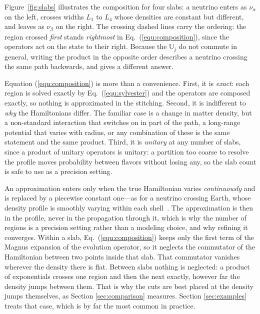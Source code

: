 \documentclass[final,5p,times,twocolumn,sort,compress]{elsarticle}
\newcommand{\eq}{Eq.}
\newcommand{\equ}[1]{\eq~(\ref{equ:#1})}
\begin{document}
Figure~\ref{fig:slabs} illustrates the composition for four slabs: a neutrino enters as $\nu_\alpha$ on the left, crosses widths $L_1$ to $L_4$ whose densities are constant but different, and leaves as $\nu_\beta$ on the right.  The crossing dashed lines carry the ordering: the region crossed \emph{first} stands \emph{rightmost} in \equ{composition}, since the operators act on the state to their right.  Because the $\mathbb{U}_j$ do not commute in general, writing the product in the opposite order describes a neutrino crossing the same path backwards, and gives a different answer.

Equation (\ref{equ:composition}) is more than a convenience.  First, it is \emph{exact}: each region is solved exactly by \equ{sylvester} and the operators are composed exactly, so nothing is approximated in the stitching.  Second, it is indifferent to \emph{why} the Hamiltonians differ.  The familiar case is a change in matter density, but a non-standard interaction that switches on in part of the path, a long-range potential that varies with radius, or any combination of these is the same statement and the same product.  Third, it is \emph{unitary} at any number of slabs, since a product of unitary operators is unitary: a partition too coarse to resolve the profile moves probability between flavors without losing any, so the slab count is safe to use as a precision setting.

An approximation enters only when the true Hamiltonian varies \emph{continuously} and is replaced by a piecewise constant one---as for a neutrino crossing Earth, whose density profile is smoothly varying within each shell~\cite{Dziewonski:1981xy}.  The approximation is then in the profile, never in the propagation through it, which is why the number of regions is a precision setting rather than a modeling choice, and why refining it converges.  Within a slab, \equ{composition} keeps only the first term of the Magnus expansion of the evolution operator, so it neglects the commutator of the Hamiltonian between two points inside that slab.  That commutator vanishes wherever the density there is flat.  Between slabs nothing is neglected: a product of exponentials crosses one region and then the next exactly, however far the density jumps between them.  That is why the cuts are best placed at the density jumps themselves, as Section \ref{sec:comparison} measures.  Section \ref{sec:examples} treats that case, which is by far the most common in practice.

\end{document}
